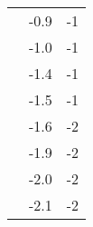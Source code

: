 \documentclass[10pt,letterpaper,twocolumn]{article}
\begin{document}
\begin{center}
\begin{tabular}{| c | c | c | }
                                         & -0.9  & -1 \\ \cline{2-3}
                                         & -1.0 & -1 \\ \cline{2-3}
                                         & -1.4 & -1 \\ \cline{2-3}
                                         & -1.5 & -1 \\ \cline{2-3}
                                         & -1.6 & -2 \\ \cline{2-3}
                                         & -1.9 & -2 \\ \cline{2-3}
                                         & -2.0 & -2 \\ \cline{2-3}
                                         & -2.1 & -2 \\ \cline{2-3}
    \hline
  \end{tabular}
  \renewcommand{\arraystretch}{1}
\end{center}
\end{document}
